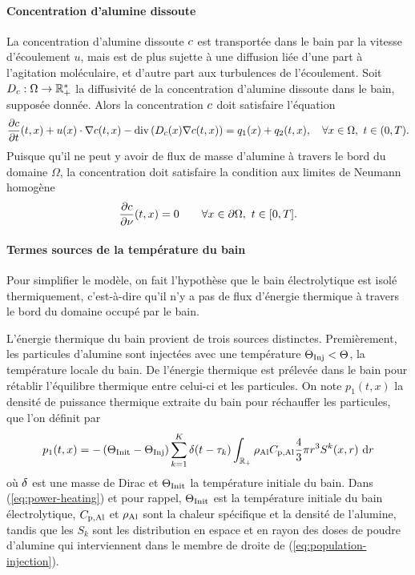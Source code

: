 \paragraph{Concentration d'alumine dissoute}
La concentration d'alumine dissoute $c$ est transportée
dans le bain par la vitesse d'écoulement $u$, mais est de plus sujette
à une diffusion liée d'une part à l'agitation moléculaire, et d'autre
part aux turbulences de l'écoulement. Soit
$D_c:\Omega\to\mathbb R^*_+$ la diffusivité de la
concentration d'alumine dissoute dans le bain, supposée donnée. Alors
la concentration $c$ doit satisfaire l'équation
\begin{equation}\label{eq:concentration}
  \frac{\partial c}{\partial t}(t, x) + u(x)\cdot\nabla c(t, x) - \mathrm{div}\left( D_c(x)
  \nabla c(t, x) \right) = q_1(x) + q_2(t, x),\quad \forall
  x\in\Omega,\ t\in (0, T).
\end{equation}
Puisque qu'il ne peut y avoir de flux de masse d'alumine à travers le
bord du domaine $\Omega$, la concentration doit satisfaire la
condition aux limites de Neumann homogène
\begin{equation}\label{eq:c-bc}
  \frac{\partial c}{\partial \nu}(t, x) = 0 \quad  \quad
  \forall x\in\partial \Omega,\ t\in[0, T].
\end{equation}

\paragraph{Termes sources de la température du bain}
Pour simplifier le modèle, on fait l'hypothèse que le bain
électrolytique est isolé thermiquement, c'est-à-dire qu'il n'y a pas
de flux d'énergie thermique à travers le bord du domaine occupé par le
bain.

L'énergie thermique du bain provient de trois sources
distinctes. Premièrement, les particules d'alumine sont injectées avec
une température $\Theta_\text{Inj} < \Theta$, la température locale du
bain. De l'énergie thermique est prélevée dans le bain pour rétablir
l'équilibre thermique entre celui-ci et les particules. On note $p_1(t,
x)$ la densité de puissance thermique extraite du bain pour réchauffer
les particules, que l'on définit par
\begin{equation}\label{eq:power-heating}
  p_1(t, x) = -\left( \Theta_\text{Init}-\Theta_\text{Inj} \right)\sum_{k = 1}^{K}\delta(t -
  \tau_k)\int_{\mathbb R_+}\rho_\mathrm{Al}C_{\mathrm{p,Al}}\frac{4}{3}\pi r^3 S^k(x, r)\,\,\mathrm dr
\end{equation}
où $\delta$ est une masse de Dirac et $\Theta_\text{Init}$ la température
initiale du bain. Dans (\ref{eq:power-heating}) et pour rappel, $\Theta_\text{Init}$ est la
température initiale du bain électrolytique, $C_{\mathrm{p,Al}}$ et
$\rho_\mathrm{Al}$ sont la chaleur spécifique et la densité de
l'alumine, tandis que les $S_k$ sont les distribution en espace et en
rayon des doses de poudre d'alumine qui interviennent dans le membre
de droite de (\ref{eq:population-injection}).

